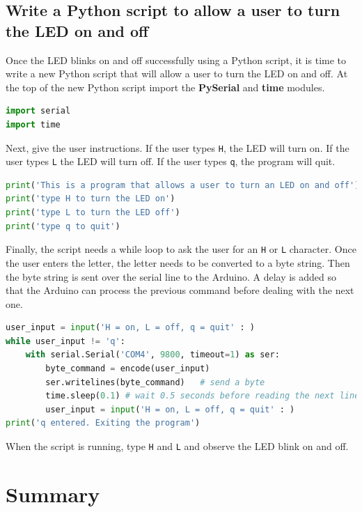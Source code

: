 \documentclass{book}
\begin{document}
    \subsection{Write a Python script to allow a user to turn the LED on and
off}\label{write-a-python-script-to-allow-a-user-to-turn-the-led-on-and-off}

    Once the LED blinks on and off successfully using a Python script, it is
time to write a new Python script that will allow a user to turn the LED
on and off. At the top of the new Python script import the
\textbf{PySerial} and \textbf{time} modules.

    \begin{lstlisting}[language=Python]
import serial
import time
\end{lstlisting}

    Next, give the user instructions. If the user types \lstinline!H!, the
LED will turn on. If the user types \lstinline!L! the LED will turn off.
If the user types \lstinline!q!, the program will quit.

    \begin{lstlisting}[language=Python]
print('This is a program that allows a user to turn an LED on and off')
print('type H to turn the LED on')
print('type L to turn the LED off')
print('type q to quit')
\end{lstlisting}

    Finally, the script needs a while loop to ask the user for an
\lstinline!H! or \lstinline!L! character. Once the user enters the
letter, the letter needs to be converted to a byte string. Then the byte
string is sent over the serial line to the Arduino. A delay is added so
that the Arduino can process the previous command before dealing with
the next one.

    \begin{lstlisting}[language=Python]
user_input = input('H = on, L = off, q = quit' : )
while user_input != 'q':
    with serial.Serial('COM4', 9800, timeout=1) as ser:
        byte_command = encode(user_input)
        ser.writelines(byte_command)   # send a byte
        time.sleep(0.1) # wait 0.5 seconds before reading the next line
        user_input = input('H = on, L = off, q = quit' : )
print('q entered. Exiting the program')
\end{lstlisting}

    When the script is running, type \lstinline!H! and \lstinline!L! and
observe the LED blink on and off.

    \section{Summary}\label{summary}
\end{document}
